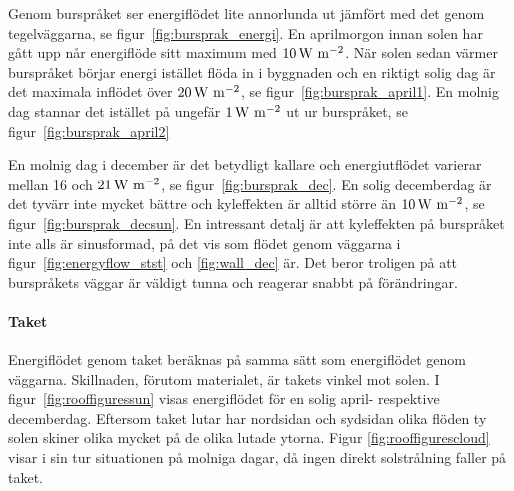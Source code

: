 Genom burspråket ser energiflödet lite annorlunda ut jämfört med det genom tegelväggarna,
se figur~\ref{fig:bursprak_energi}. En aprilmorgon innan solen har gått upp når energiflöde
sitt maximum med $\unit[10]{W~m^{-2}}$. När solen sedan värmer burspråket börjar energi
istället flöda in i byggnaden och en riktigt solig dag är det maximala inflödet över
$\unit[20]{W~m^{-2}}$, se figur~\ref{fig:bursprak_april1}. En molnig dag stannar det istället på ungefär $\unit[1]{W~m^{-2}}$ ut ur burspråket, se figur~\ref{fig:bursprak_april2}

En molnig dag i december är det betydligt kallare och energiutflödet varierar mellan 16 och
$\unit[21]{W~m^{-2}}$, se figur~\ref{fig:bursprak_dec}. En solig decemberdag är det tyvärr
inte mycket bättre och kyleffekten är alltid större än $\unit[10]{W~m^{-2}}$, se
figur~\ref{fig:bursprak_decsun}.
En intressant detalj är att kyleffekten på burspråket inte alls är sinusformad, på det vis som flödet genom väggarna i figur~\ref{fig:energyflow_stst} och \ref{fig:wall_dec} är. Det beror troligen på att burspråkets väggar är väldigt tunna och reagerar snabbt på förändringar.

\paragraph{Taket}


Energiflödet genom taket beräknas på samma sätt som energiflödet genom väggarna. Skillnaden, förutom materialet, är takets vinkel mot solen. I figur~\ref{fig:rooffiguressun} visas energiflödet för en solig april- respektive decemberdag. Eftersom taket lutar har nordsidan och sydsidan olika flöden ty solen skiner olika mycket på de olika lutade ytorna. Figur \ref{fig:rooffigurescloud} visar i sin tur situationen på molniga dagar, då ingen direkt solstrålning faller på taket.



